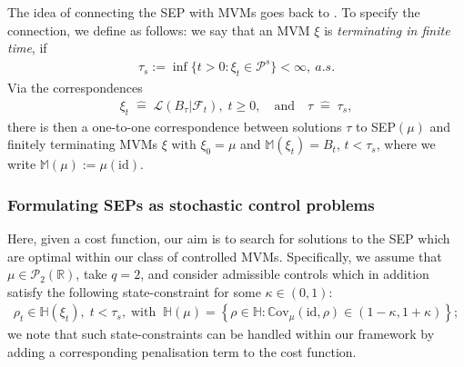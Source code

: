 \documentclass{article}
\theoremstyle{definition}
\numberwithin{equation}{section}
\numberwithin{theorem}{section}
\newcommand{\R}{\mathbb{R}}
\newcommand{\as}{a.s.}
\newcommand{\Fc}{\mathcal{F}}
\newcommand{\Hb}{\mathbb{H}}
\newcommand{\Mb}{\mathbb{M}}
\newcommand{\Pc}{\mathcal{P}}
\newcommand{\Cov}{\mathbb{C}\mathrm{ov}}
\begin{document}
	The idea of connecting the SEP with MVMs goes back to \cite{eldan2016}. To specify the connection, we define as follows: we say that an MVM $\xi$ is {\it terminating in finite time}, if 
  		\begin{align}\label{def:TMVM}
  			\tau_s:= \inf \{t>0: \xi_t \in \Pc^s\}<\infty,~\as{}
  		\end{align} 
 	Via the correspondences
	\begin{align*}
		\xi_t\;\widehat =\;\mathcal{L}(B_\tau|\Fc_t),\;t\ge 0,
		\quad\textrm{and}\quad
		\tau\;\widehat=\;\tau_s,
	\end{align*}
	there is then a one-to-one correspondence between solutions $\tau$ to SEP$(\mu)$ and finitely terminating MVMs $\xi$ with $\xi_0=\mu$ and $\Mb(\xi_t)=B_t$, $t<\tau_s$, where we write $\Mb(\mu):=\mu(\mathrm{id})$.
	


	\subsubsection*{Formulating SEPs as stochastic control problems}
	
	Here, given a cost function, our aim is to search for solutions to the SEP which are optimal within our class of controlled MVMs. 
	Specifically, we assume that $\mu\in\Pc_2(\R)$, take $q=2$, and consider admissible controls which in addition satisfy the following state-constraint for some $\kappa\in(0,1)$:
	\begin{align}\label{eq_state-constraint}
	\rho_t\in\Hb(\xi_t),\;t<\tau_s,\;
	\textrm{with}\;\;
	\Hb(\mu)=\left\{\rho\in\Hb:\Cov_{\mu}(\mathrm{id},\rho) \in (1-\kappa,1+\kappa) \right\};
	\end{align}
	we note that such state-constraints can be handled within our framework by adding a corresponding penalisation term to the cost function. 
	
\end{document}
